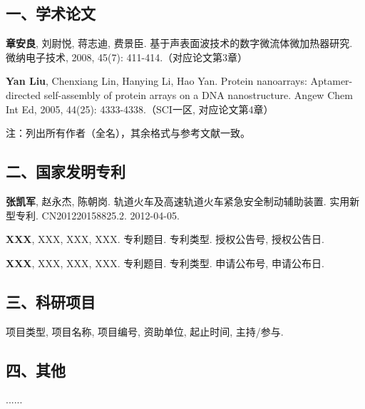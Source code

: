 
\begin{resume}
%
%
%


  \subsection*{一、学术论文}
  \begin{achievements}
    \item {\bfseries 章安良}, 刘尉悦, 蒋志迪, 费景臣. 基于声表面波技术的数字微流体微加热器研究. 微纳电子技术, 2008, 45(7): 411-414.（对应论文第3章）
    \item {\bfseries Yan Liu}, Chenxiang Lin, Hanying Li, Hao Yan. Protein nanoarrays: Aptamer-directed self-assembly of protein arrays on a DNA nanostructure. Angew Chem Int Ed, 2005, 44(25): 4333-4338.（SCI一区, 对应论文第4章）
  \end{achievements}
  注：列出所有作者（全名），其余格式与参考文献一致。
\vskip 20pt%
  \subsection*{二、国家发明专利}
  \begin{achievements}
  	\item {\bfseries 张凯军}, 赵永杰, 陈朝岗. 轨道火车及高速轨道火车紧急安全制动辅助装置. 实用新型专利. CN201220158825.2. 2012-04-05.
    \item {\bfseries XXX}, XXX, XXX, XXX. 专利题目. 专利类型. 授权公告号, 授权公告日.
    \item {\bfseries XXX}, XXX, XXX, XXX. 专利题目. 专利类型. 申请公布号, 申请公布日.
  \end{achievements}
\vskip 20pt%
  \subsection*{三、科研项目}
  \begin{achievements}
  	\item 项目类型, 项目名称, 项目编号, 资助单位, 起止时间, 主持/参与.
  \end{achievements}
\vskip 20pt%
  \subsection*{四、其他}
  ......
\end{resume}

